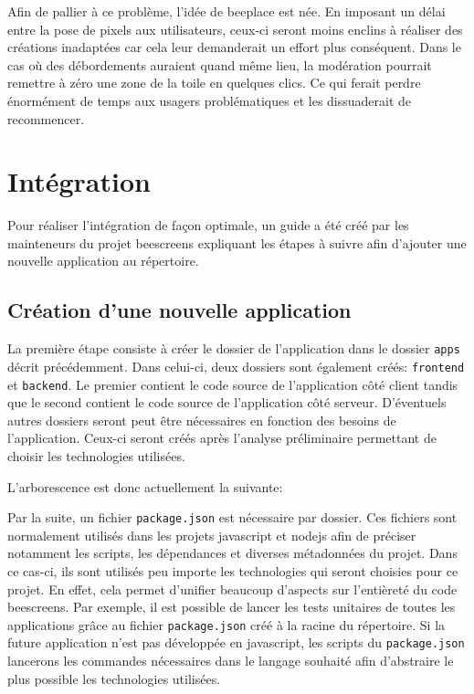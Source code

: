 Afin de pallier à ce problème, l'idée de \gls{beeplace} est née. En imposant un délai entre la pose de pixels aux utilisateurs, ceux-ci seront moins enclins à réaliser des créations inadaptées car cela leur demanderait un effort plus conséquent. Dans le cas où des débordements auraient quand même lieu, la modération pourrait remettre à zéro une zone de la toile en quelques clics. Ce qui ferait perdre énormément de temps aux usagers problématiques et les dissuaderait de recommencer.

\section{Intégration}

Pour réaliser l'intégration de façon optimale, un guide \cite{addapptobeescreens} a été créé par les mainteneurs du projet \gls{beescreens} expliquant les étapes à suivre afin d'ajouter une nouvelle application au répertoire.

\subsection{Création d'une nouvelle application}

La première étape consiste à créer le dossier de l'application dans le dossier \texttt{apps} décrit précédemment. Dans celui-ci, deux dossiers sont également créés: \texttt{frontend} et \texttt{backend}. Le premier contient le code source de l'application côté client tandis que le second contient le code source de l'application côté serveur. D'éventuels autres dossiers seront peut être nécessaires en fonction des besoins de l'application. Ceux-ci seront créés après l'analyse préliminaire permettant de choisir les technologies utilisées.

L'arborescence est donc actuellement la suivante:


Par la suite, un fichier \texttt{package.json} est nécessaire par dossier. Ces fichiers sont normalement utilisés dans les projets \gls{javascript} et \gls{nodejs} afin de préciser notamment les scripts, les dépendances et diverses métadonnées du projet. Dans ce cas-ci, ils sont utilisés peu importe les technologies qui seront choisies pour ce projet. En effet, cela permet d'unifier beaucoup d'aspects sur l'entièreté du code \gls{beescreens}. Par exemple, il est possible de lancer les tests unitaires de toutes les applications grâce au fichier \texttt{package.json} créé à la racine du répertoire. Si la future application n'est pas développée en \gls{javascript}, les scripts du \texttt{package.json} lancerons les commandes nécessaires dans le langage souhaité afin d'abstraire le plus possible les technologies utilisées.

